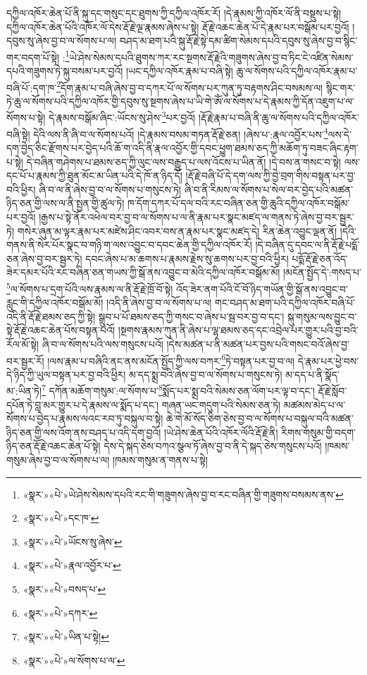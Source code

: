 དཀྱིལ་འཁོར་ཆེན་པོ་ནི་སྐུ་དང་གསུང་དང་ཐུགས་ཀྱི་དཀྱིལ་འཁོར་རོ། །དེ་རྣམས་ཀྱི་འཁོར་ལོ་ནི་བསྡུས་པ་སྟེ། དཀྱིལ་འཁོར་ཆེན་པོའི་འཁོར་ལོ་དེས་རྡོ་རྗེ་ལྔ་རྣམས་ཞེས་པ་སྟེ། རྡོ་རྗེ་འཆང་ཆེན་པོ་དེ་རྣམ་པར་བསྒོམ་པར་བྱའོ། །དབུས་སུ་ཞེས་བྱ་བ་ལ་སོགས་པ་ལ། བཤད་མ་ཐག་པའི་སྐུ་རྡོ་རྗེ་སྟེ་དམ་ཚིག་སེམས་དཔའི་དབུས་སུ་ཞེས་བྱ་བ་སྙིང་གར་བདག་པོ་སྟེ། :\footnote{«སྣར་»«པེ་»ཡེ་ཤེས་སེམས་དཔའི་རང་གི་གཟུགས་ཞེས་བྱ་བ་རང་བཞིན་གྱི་གཟུགས་བསམས་ནས་}ཡེ་ཤེས་སེམས་དཔའི་ཐུགས་ཀར་རང་སྔགས་རྡོ་རྗེའི་གཟུགས་ཞེས་བྱ་བ་ཏིང་ངེ་འཛིན་སེམས་དཔའི་གཟུགས་ཏེ་སྐུ་བསམ་པར་བྱའོ། །ཡང་དཀྱིལ་འཁོར་རྣམ་པ་བཞི་སྟེ། ཆུ་ལ་སོགས་པའི་དཀྱིལ་འཁོར་རྣམ་པ་བཞི་པོ་:དག་ཁ་\footnote{«སྣར་»«པེ་»དང་ཁ་}དོག་རྣམ་པ་བཞི་ཞེས་བྱ་བ་དཀར་པོ་ལ་སོགས་པར་ཀུན་ཏུ་བརྟགས་ཤིང་བསམས་ལ། སྙིང་གར་ཏེ་ཆུ་ལ་སོགས་པའི་དཀྱིལ་འཁོར་གྱི་དབུས་སུ་སྔགས་ཞེས་པ་ཡི་གེ་ཨོཾ་ལ་སོགས་པ་དེ་རྣམས་ཀྱི་དོན་འཇུག་པ་ལ་སོགས་པ་སྟེ། དེ་རྣམས་བསྒོམ་ཞིང་:ཡོངས་སུ་ཤེས་\footnote{«སྣར་»«པེ་»ཡོངས་སུ་ཞེས་}པར་བྱའོ། །རྡོ་རྗེ་རྣམ་པ་བཞི་ནི་ཆུ་ལ་སོགས་པའི་དཀྱིལ་འཁོར་བཞི་སྟེ། དེའི་ལས་ནི་ཞི་བ་ལ་སོགས་པའོ། །དེ་རྣམས་བསམ་གཏན་རྡོ་རྗེ་ཅན། །ཞེས་པ་:རྣལ་འབྱོར་པས་\footnote{«སྣར་»«པེ་»རྣལ་འབྱོར་པ་}ལས་དེ་དག་བྱེད་ཅིང་རྫོགས་པར་བྱེད་པའི་ཆོ་ག་འདི་ནི་རྣལ་འབྱོར་གྱི་དབང་ཕྱུག་ཐམས་ཅད་ཀྱི་མཆོག་ཏུ་བཟང་ཞིང་རྟག་པ་སྟེ། དེ་བཞིན་གཤེགས་པ་ཐམས་ཅད་ཀྱི་ལུང་ལས་བརྒྱུད་པ་ལས་འོངས་པ་ཡིན་ནོ། །དེ་བས་ན་གསང་བ་སྟེ། ལས་དང་པོ་པ་རྣམས་ཀྱི་ཐུན་མོང་མ་ཡིན་པའི་དེ་ཁོ་ན་ཉིད་དོ། །རྡོ་རྗེ་བཞི་པོ་དེ་དག་ལས་ཀྱི་བྱེ་བྲག་གིས་བསྟན་པར་བྱ་བའི་ཕྱིར། ཞི་བ་ལ་ནི་ཞེས་བྱ་བ་ལ་སོགས་པ་གསུངས་ཏེ། ཞི་བ་ནི་རིམས་ལ་སོགས་པ་སེལ་བར་བྱེད་པའི་མཚན་ཉིད་ཅན་གྱི་ལས་ལ་ནི་སྤྱན་གྱི་ཚུལ་ཏེ། ཁ་དོག་དཀར་པོ་དལ་བའི་རང་བཞིན་ཅན་གྱི་ཆུའི་དཀྱིལ་འཁོར་བསྒོམ་པར་བྱའོ། །རྒྱས་པ་སྟེ་ནོར་འཕེལ་བར་བྱ་བ་ལ་སོགས་པ་ལ་ནི་རྣམ་པར་སྣང་མཛད་ལ་གནས་ཏེ་ཞེས་བྱ་བར་སྦྱར་ཏེ། གསེར་ཞུན་མ་ལྟར་རྣམ་པར་མཛེས་ཤིང་འབར་བས་ན་རྣམ་པར་སྣང་མཛད་དེ། རིན་ཆེན་འབྱུང་ལྡན་ནོ། །དེའི་གནས་ནི་སེར་པོར་སྣང་བ་གཉི་ག་ལས་འབྱུང་བ་དབང་ཆེན་གྱི་དཀྱིལ་འཁོར་རོ། །དེ་བཞིན་དུ་དབང་ལ་ནི་རྡོ་རྗེ་པདྨོ་ཅན་ཞེས་བྱ་བར་སྦྱར་ཏེ། དབང་ཞེས་པ་མ་ཆགས་པ་རྣམས་རྗེས་སུ་ཆགས་པར་བྱ་བའི་ཕྱིར། པདྨོ་རྡོ་རྗེ་ཅན་འོད་ཟེར་དམར་པོའི་རང་བཞིན་ཅན་གཡས་ཀྱི་སྒོ་ནས་འབྱུང་བ་མེའི་དཀྱིལ་འཁོར་བསྒོམ་མོ། །མངོན་སྤྱོད་དེ་:གསད་པ་\footnote{«སྣར་»«པེ་»བསད་པ་}ལ་སོགས་པ་དྲག་པོའི་ལས་རྣམས་ལ་ནི་རྡོ་རྗེ་ཁྲོ་བོ་སྟེ། འོད་ཟེར་ནག་པོའི་ངོ་བོ་ཉིད་གཡོན་གྱི་སྒོ་ནས་འབྱུང་བ་རླུང་གི་དཀྱིལ་འཁོར་བསྒོམ་མོ། །འདི་ནི་ཞེས་བྱ་བ་ལ་སོགས་པ་ལ། གང་བཤད་མ་ཐག་པའི་དཀྱིལ་འཁོར་བཞི་པོ་འདི་ནི་རྡོ་རྗེ་ཐམས་ཅད་ཀྱི་སྟེ། སྒྲུབ་པ་པོ་ཐམས་ཅད་ཀྱི་གསང་བ་ཞེས་པ་སྦ་བར་བྱ་བ་དང་། སྐུ་གསུམ་ལས་བྱུང་བ་སྟེ་རྡོ་རྗེ་འཆང་ཆེན་པོས་བསྟན་པའོ། །སྔགས་རྣམས་ཀུན་ནི་ཞེས་པ་ལྷ་ཐམས་ཅད་དང་འབྲེལ་པར་གྱུར་པའི་བྱ་བའི་རོལ་མོ་སྟེ། ཞི་བ་ལ་སོགས་པའི་ལས་གསུངས་པའོ། །དེས་མཚན་པ་ནི་མཚན་པར་བྱས་པའི་གསང་བའོ་ཞེས་བྱ་བར་སྦྱར་རོ། །ལས་རྣམ་པ་བཞིའི་ནང་ནས་མངོན་སྤྱོད་ཀྱི་ལས་བཀར་\footnote{«སྣར་»«པེ་»དཀར་}ཏེ་བསྟན་པར་བྱ་བ་ལ། དེ་རྣམ་པར་ཕྱེ་བས་དེ་ཉིད་ཀྱི་ཡུལ་བསྟན་པར་བྱ་བའི་ཕྱིར། མ་དད་སྨྲ་བའི་ཞེས་བྱ་བ་ལ་སོགས་པ་གསུངས་ཏེ། མ་དད་པ་ནི་སྣོད་མ་:ཡིན་ཏེ།\footnote{«སྣར་»«པེ་»ཡིན་པ་སྟེ།} དཀོན་མཆོག་གསུམ་:ལ་སོགས་པ་\footnote{«སྣར་»«པེ་»ལ་སོགས་པ་ལ་}སྨོད་པར་སྨྲ་བའི་སེམས་ཅན་ལོག་པར་ལྟ་བ་དང་། རྡོ་རྗེ་སློབ་དཔོན་ཏེ་བླ་མར་གྱུར་པ་དེ་རྣམས་ལ་སྨོད་པ་དང་། གཞན་ཡང་གདུག་པའི་སེམས་ཅན་ཏེ། མཚམས་མེད་པ་ལ་སོགས་པ་བྱེད་པ་རྣམས་ལའང་རབ་ཏུ་བསྐུལ་བ་སྟེ། ཆེ་གེ་མོ་སོད་ཅིག་ཅེས་བྱ་བ་ལ་སོགས་པ་བསྐུལ་བའི་མཚན་ཉིད་ཅན་གྱི་ལས་འོག་ནས་བཤད་པ་འདི་དག་བྱའོ། །ཡེ་ཤེས་ཆེན་པོའི་འཁོར་ལོའི་རྡོ་རྗེ་ནི། རིགས་གསུམ་གྱི་བདག་ཉིད་ཅན་རྡོ་རྗེ་འཆང་ཆེན་པོ་སྟེ། དེས་དེ་སྐད་ཅེས་བཀའ་སྩལ་ཏོ་ཞེས་བྱ་བ་ནི་དེ་སྐད་ཅེས་གསུངས་པའོ། །ཁམས་གསུམ་ཞེས་བྱ་བ་ལ་སོགས་པ་ལ། །ཁམས་གསུམ་ན་གནས་པ་སྟེ། 